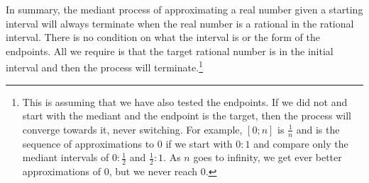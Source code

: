 \documentclass[12pt]{article}
\begin{document}
In summary, the mediant process of approximating a real number given a starting interval will always terminate when the real number is a rational in the rational interval. There is no condition on what the interval is or the form of the endpoints. All we require is that the target rational number is in the initial interval and then the process will terminate.\footnote{This is assuming that we have also tested the endpoints. If we did not and start with the mediant and the endpoint is the target, then the process will converge towards it, never switching. For example, $[0; n]$ is $\frac{1}{n}$ and is the sequence of approximations to $0$ if we start with $0:1$ and compare only the mediant intervals of $0:\frac{1}{2}$ and $\frac{1}{2}:1$. As $n$ goes to infinity, we get ever better approximations of $0$, but we never reach $0$.}



\medskip

\normalem %

\printbibliography
\end{document}
